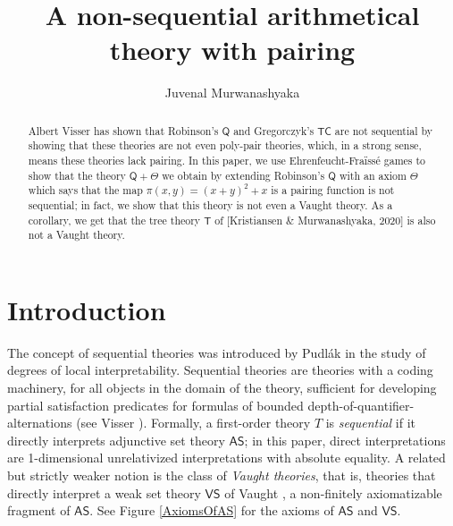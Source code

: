 \documentclass[10pt,a4paper, openany,  oldfontcommands]{memoir}
\title{A non-sequential arithmetical theory  with pairing}
\author{Juvenal Murwanashyaka}
\affil{Institute of Mathematics,  Czech Academy of Sciences,   Czech Republic}
\newtheorem{open problem} [theorem] {Open Problem}
\newtheorem{open question} [theorem] {Open Question}
\begin{document}
\maketitle 
 



\begin{abstract}
Albert Visser 
has shown that Robinson's  $  \mathsf{Q} $ and Gregorczyk's $  \mathsf{TC} $  are not sequential by showing that these theories are not even poly-pair theories, which, in a strong sense, means these theories lack pairing.   
In this paper, we  use   Ehrenfeucht-Fra\"iss\'e games  to  show  that  the theory $  \mathsf{Q} + \Theta  $    we obtain by extending   Robinson's $  \mathsf{Q} $  with an axiom  $  \Theta $  which says that the map     $  \pi (x, y ) = (x+y)^2 + x $  is a pairing function 
is not sequential; in fact,   we show that this theory  is not   even  a Vaught theory.
As a corollary,  we get that the tree theory  $  \mathsf{T} $  of  [Kristiansen \& Murwanashyaka,  2020] is also not a Vaught theory. 
\end{abstract}





\section{Introduction}






The concept of  sequential theories was introduced by   Pudl\' ak  \cite{Pudlak1983} in the  study of  degrees of   local  interpretability. 
 Sequential  theories are   theories with a coding machinery, for  all objects in the domain of the theory,    sufficient for developing 
partial  satisfaction predicates for formulas of bounded depth-of-quantifier-alternations  (see Visser \cite{Visser2019}). 
Formally, a first-order theory  $T$ is  \emph{sequential}  if  it   directly interprets  adjunctive set theory  $  \mathsf{AS} $; 
in this paper,   direct interpretations are 1-dimensional unrelativized interpretations  with absolute equality.
A related but strictly weaker notion is the class of \emph{Vaught theories}, that is, 
theories that directly interpret  a weak set theory  $  \mathsf{VS}   $  of   Vaught    \cite{Vaught1967}, 
a non-finitely axiomatizable fragment of  $  \mathsf{AS} $. 
See Figure  \ref{AxiomsOfAS}  for the axioms of  $  \mathsf{AS} $  and   $  \mathsf{VS} $. 
\end{document}
